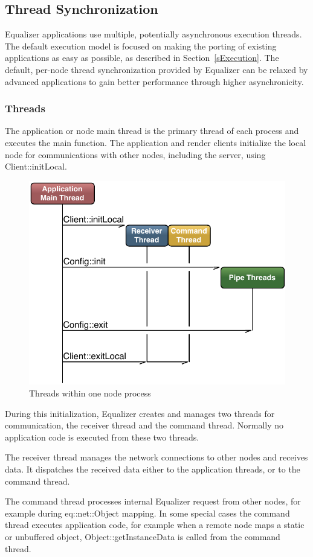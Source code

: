 \documentclass[10pt,a4]{scrartcl}
\newcommand{\sref}[1]{Section~\ref{#1}}
\begin{document}
\subsection{\label{sThreads}Thread Synchronization}

Equalizer applications use multiple, potentially asynchronous execution
threads. The default execution model is focused on making the porting of
existing applications as easy as possible, as described in
\sref{sExecution}. The default, per-node thread synchronization provided
by Equalizer can be relaxed by advanced applications to gain better
performance through higher asynchronicity.

\subsubsection{Threads}

The application or node main thread is the primary thread of each
process and executes the \textsf{main} function. The application and
render clients initialize the local node for communications with other
nodes, including the server, using \textsf{Client::initLocal}.

\begin{figure}
  \includegraphics[width=.618\textwidth]{images/threads.pdf}
  {\caption{\label{fThreads}Threads within one node process}}
\end{figure}
During this initialization, Equalizer creates and manages two threads
for communication, the receiver thread and the command thread. Normally
no application code is executed from these two threads.

The receiver thread manages the network connections to other nodes and
receives data. It dispatches the received data either to the application
threads, or to the command thread.

The command thread processes internal Equalizer request from other
nodes, for example during \textsf{eq::net::Object} mapping. In some
special cases the command thread executes application code, for example
when a remote node maps a static or unbuffered object,
\textsf{Object::getInstanceData} is called from the command thread.
\end{document}
